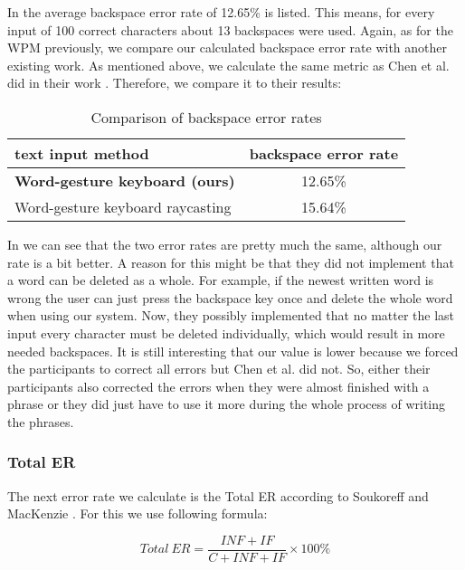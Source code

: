 In  the average backspace error rate of 12.65\% is listed. This means, for every input of 100 correct characters about 13 backspaces were used. Again, as for the WPM previously, we compare our calculated backspace error rate with another existing work. As mentioned above, we calculate the same metric as Chen et al. did in their work \cite{10.1145/3290607.3312762}. Therefore, we compare it to their results:
\begin{table}[H]
    \centering
    \caption{Comparison of backspace error rates}
    \begin{tabular}{lc} \toprule
        text input method&backspace error rate\\ \midrule
        \textbf{Word-gesture keyboard (ours)}&12.65\%\\
        Word-gesture keyboard raycasting&15.64\%\\
        \bottomrule
    \end{tabular}
    \label{tab:error_backspace_compare}
\end{table}
In  we can see that the two error rates are pretty much the same, although our rate is a bit better. A reason for this might be that they did not implement that a word can be deleted as a whole. For example, if the newest written word is wrong the user can just press the backspace key once and delete the whole word when using our system. Now, they possibly implemented that no matter the last input every character must be deleted individually, which would result in more needed backspaces. It is still interesting that our value is lower because we forced the participants to correct all errors but Chen et al. did not. So, either their participants also corrected the errors when they were almost finished with a phrase or they did just have to use it more during the whole process of writing the phrases.

\subsubsection{Total ER}
\label{sec:total_er}
The next error rate we calculate is the Total ER according to Soukoreff and MacKenzie \cite{10.1145/642611.642632}. For this we use following formula:

\begin{equation}
    Total\ ER = \frac{INF + IF}{C + INF + IF} \times 100\%
\end{equation}

